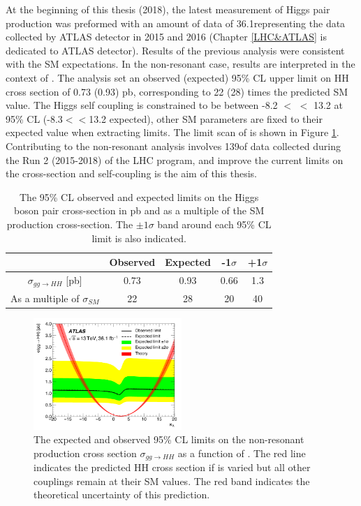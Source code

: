 At the beginning of this thesis (2018), the latest measurement of Higgs pair production was preformed with an amount of data of 36.1\ifb representing the data collected by ATLAS detector in 2015 and 2016 (Chapter \ref{LHC&ATLAS} is dedicated to ATLAS detector). Results of the previous analysis were consistent with the SM expectations. In the non-resonant case, results are interpreted in the context of \kl. The analysis set an observed (expected) 95\% CL upper limit on HH cross section of 0.73 (0.93) pb, corresponding to 22 (28) times the predicted SM value. The Higgs self coupling is constrained to be between -8.2 $<$ \kl $<$ 13.2 at 95\% CL (-8.3$<$\kl$<$13.2 expected), other SM parameters are fixed to their expected value when extracting limits. The limit scan of \kl is shown in Figure \ref{fig:chap1:HH:CM:KL}. \\
Contributing to the \HHyybb non-resonant analysis involves 139\ifb of data collected during the Run 2 (2015-2018) of the LHC program, and improve the current limits on the cross-section and self-coupling is the aim of this thesis. 
\begin{table}[H]
    \centering
    \begin{tabular}{ccccc}
    \hline
         & Observed & Expected & -1$\sigma$ & +1$\sigma$ \\
    \hline
        $\sigma_{gg\rightarrow HH}$ [pb] & 0.73 & 0.93 & 0.66 & 1.3 \\
        As a multiple of $\sigma_{SM}$ & 22 & 28 & 20 & 40 \\
        \hline
    \end{tabular}
    \caption{The 95\% CL observed and expected limits on the Higgs boson pair cross-section in pb and as a multiple of the SM production cross-section. The $\pm1\sigma$ band around each 95\% CL limit is also indicated.}
    \label{tab:chap1:HH:CM:XSEC}
\end{table}
\begin{figure}[H]
    \centering
    \includegraphics[width=0.5\textwidth]{Ch1/Img/kl_36ifb.png}
    \caption{The expected and observed 95\% CL limits on the non-resonant production cross section $\sigma_{gg\rightarrow HH}$ as a function of \kl. The red line indicates the predicted HH cross section if \kl is varied but all other couplings remain at their SM values. The red band indicates the theoretical uncertainty of this prediction.}
    \label{fig:chap1:HH:CM:KL}
\end{figure}
